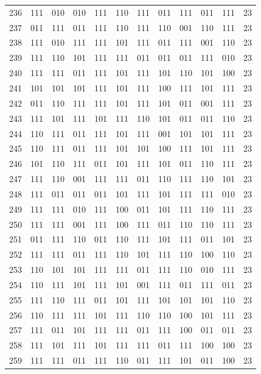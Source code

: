 \begin{longtable}{r*{10}{c}r}
236 & 111 & 010 & 010 & 111 & 110 & 111 & 011 & 111 & 011 & 111 & 23\\
237 & 011 & 111 & 011 & 111 & 110 & 111 & 110 & 001 & 110 & 111 & 23\\
238 & 111 & 010 & 111 & 111 & 101 & 111 & 011 & 111 & 001 & 110 & 23\\
239 & 111 & 110 & 101 & 111 & 111 & 011 & 011 & 011 & 111 & 010 & 23\\
240 & 111 & 111 & 011 & 111 & 101 & 111 & 101 & 110 & 101 & 100 & 23\\
241 & 101 & 101 & 101 & 111 & 101 & 111 & 100 & 111 & 101 & 111 & 23\\
242 & 011 & 110 & 111 & 111 & 101 & 111 & 101 & 011 & 001 & 111 & 23\\
243 & 111 & 101 & 111 & 101 & 111 & 110 & 101 & 011 & 011 & 110 & 23\\
244 & 110 & 111 & 011 & 111 & 101 & 111 & 001 & 101 & 101 & 111 & 23\\
245 & 110 & 111 & 011 & 111 & 101 & 101 & 100 & 111 & 101 & 111 & 23\\
246 & 101 & 110 & 111 & 011 & 101 & 111 & 101 & 011 & 110 & 111 & 23\\
247 & 111 & 110 & 001 & 111 & 111 & 011 & 110 & 111 & 110 & 101 & 23\\
248 & 111 & 011 & 011 & 011 & 101 & 111 & 101 & 111 & 111 & 010 & 23\\
249 & 111 & 111 & 010 & 111 & 100 & 011 & 101 & 111 & 110 & 111 & 23\\
250 & 111 & 111 & 001 & 111 & 100 & 111 & 011 & 110 & 110 & 111 & 23\\
251 & 011 & 111 & 110 & 011 & 110 & 111 & 101 & 111 & 011 & 101 & 23\\
252 & 111 & 111 & 011 & 111 & 110 & 101 & 111 & 110 & 100 & 110 & 23\\
253 & 110 & 101 & 101 & 111 & 111 & 011 & 111 & 110 & 010 & 111 & 23\\
254 & 110 & 111 & 101 & 111 & 101 & 001 & 111 & 011 & 111 & 011 & 23\\
255 & 111 & 110 & 111 & 011 & 101 & 111 & 101 & 101 & 101 & 110 & 23\\
256 & 110 & 111 & 111 & 101 & 111 & 110 & 110 & 100 & 101 & 111 & 23\\
257 & 111 & 011 & 101 & 111 & 111 & 011 & 111 & 100 & 011 & 011 & 23\\
258 & 111 & 101 & 111 & 101 & 111 & 111 & 011 & 111 & 100 & 100 & 23\\
259 & 111 & 111 & 011 & 111 & 110 & 011 & 111 & 101 & 011 & 100 & 23\\

\end{longtable}
